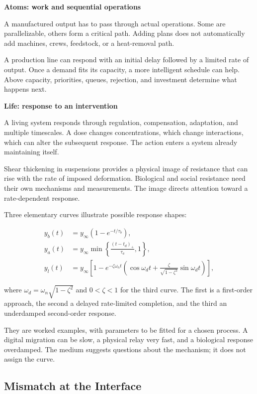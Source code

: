 \documentclass[11pt,openany]{book}
\newcommand{\subhead}[1]{\par\medskip\noindent\textbf{#1}\par\nobreak\smallskip}
\begin{document}
\subhead{Atoms: work and sequential operations}

A manufactured output has to pass through actual operations. Some are parallelizable, others form a critical path. Adding plans does not automatically add machines, crews, feedstock, or a heat-removal path.

A production line can respond with an initial delay followed by a limited rate of output. Once a demand fits its capacity, a more intelligent schedule can help. Above capacity, priorities, queues, rejection, and investment determine what happens next.

\subhead{Life: response to an intervention}

A living system responds through regulation, compensation, adaptation, and multiple timescales. A dose changes concentrations, which change interactions, which can alter the subsequent response. The action enters a system already maintaining itself.

Shear thickening in suspensions provides a physical image of resistance that can rise with the rate of imposed deformation.\cite{brown2014shear} Biological and social resistance need their own mechanisms and measurements. The image directs attention toward a rate-dependent response.

Three elementary curves illustrate possible response shapes:

\begin{align}
y_b(t)&=y_\infty(1-e^{-t/\tau_b}),\label{eq:resp-bit}\\
y_a(t)&=y_\infty\min\left\{\frac{(t-t_d)_+}{\tau_a},1\right\},\label{eq:resp-atom}\\
y_l(t)&=y_\infty\left[1-e^{-\zeta\omega_n t}
\left(\cos\omega_dt+\frac{\zeta}{\sqrt{1-\zeta^2}}\sin\omega_dt\right)\right],
\label{eq:resp-life}
\end{align}

where $\omega_d=\omega_n\sqrt{1-\zeta^2}$ and $0<\zeta<1$ for the third curve. The first is a first-order approach, the second a delayed rate-limited completion, and the third an underdamped second-order response.

They are worked examples, with parameters to be fitted for a chosen process. A digital migration can be slow, a physical relay very fast, and a biological response overdamped. The medium suggests questions about the mechanism; it does not assign the curve.

\subsection{Mismatch at the Interface}
\end{document}
